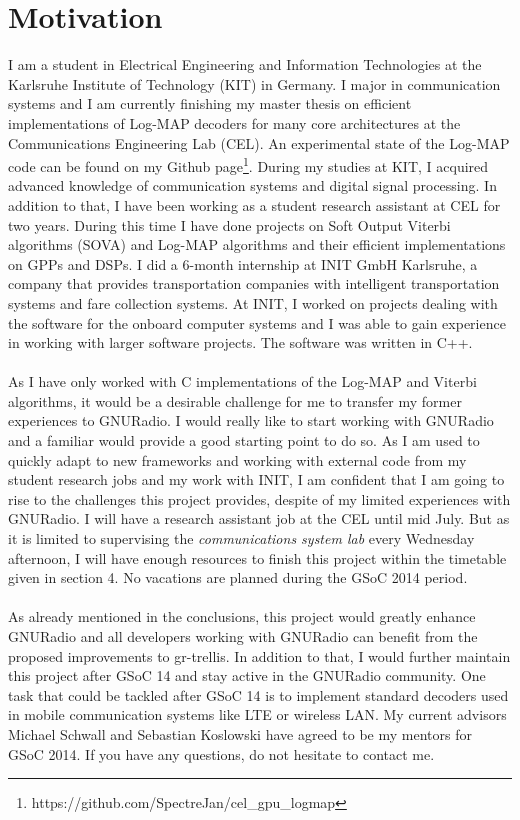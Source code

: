 \documentclass[11pt,		%
	    DIV12,		%
	    a4paper,		%
	    final,		%
	    halfparskip,	%
	    ]{scrartcl}		%
\begin{document}
\section{Motivation}
I am a student in Electrical Engineering and Information Technologies at the Karlsruhe Institute of Technology (KIT) in Germany. I major in communication systems and I am currently finishing my master thesis on efficient implementations of Log-MAP decoders for many core architectures at the Communications Engineering Lab (CEL). An experimental state of the Log-MAP code can be found on my Github page\footnote[1]{https://github.com/SpectreJan/cel\_gpu\_logmap}. During my studies at KIT, I acquired advanced knowledge of communication systems and digital signal processing. In addition to that, I have been working as a student research assistant at CEL for two years. During this time I have done projects on Soft Output Viterbi algorithms (SOVA) and Log-MAP algorithms and their efficient implementations on GPPs and DSPs. I did a 6-month internship at INIT GmbH Karlsruhe, a company that provides transportation companies with intelligent transportation systems and fare collection systems. At INIT, I worked on projects dealing with the software for the onboard computer systems and I was able to gain experience in working with larger software projects. The software was written in C++.\\ \\As I have only worked with C implementations of the Log-MAP and Viterbi algorithms, it would be a desirable challenge for me to transfer my former experiences to GNURadio. I would really like to start working with GNURadio and a familiar would provide a good starting point to do so. As I am used to quickly adapt to new frameworks and working with external code from my student research jobs and my work with INIT, I am confident that I am going to rise to the challenges this project provides, despite of my limited experiences with GNURadio. I will have a research assistant job at the CEL until mid July. But as it is limited to supervising the \textit{communications system lab} every Wednesday afternoon, I will have enough resources to finish this project within the timetable given in section 4. No vacations are planned during the GSoC 2014 period.\\ \\As already mentioned in the conclusions, this project would greatly enhance GNURadio and all developers working with GNURadio can benefit from the proposed improvements to gr-trellis. In addition to that, I would further maintain this project after GSoC 14 and stay active in the GNURadio community. One task that could be tackled after GSoC 14 is to implement standard decoders used in mobile communication systems like LTE or wireless LAN. My current advisors Michael Schwall and Sebastian Koslowski have agreed to be my mentors for GSoC 2014. If you have any questions, do not hesitate to contact me.\newpage                    
\appendix

%  
%  
%  
  
\end{document}
